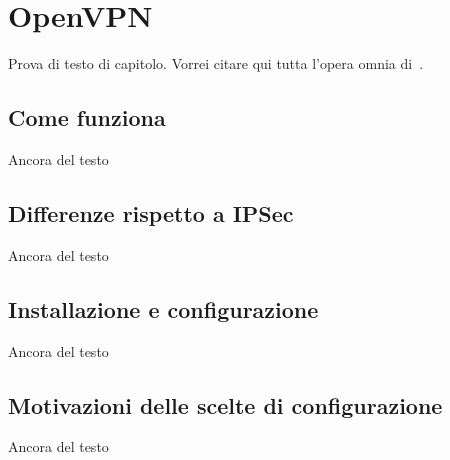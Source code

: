 \section{OpenVPN}\label{se:prima-sezione}

Prova di testo di capitolo. Vorrei citare qui tutta l'opera omnia di~\cite{IEEE:1990,WIKI:INTEROP,BOX:1997,AHL:1996}.

\subsection{Come funziona}
Ancora del testo

\subsection{Differenze rispetto a IPSec}
Ancora del testo

\subsection{Installazione e configurazione}
Ancora del testo

\subsection{Motivazioni delle scelte di configurazione}
Ancora del testo
